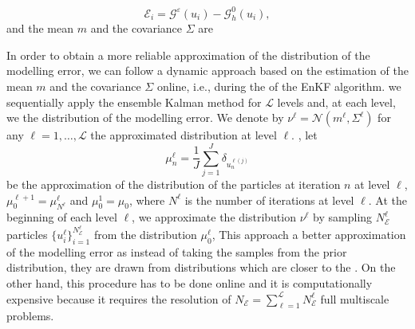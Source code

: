 \documentclass[10pt]{article}
\begin{document}
\[ \mathcal{E}_i = \mathcal{G}^{\varepsilon}(u_i) - \mathcal{G}^0_h(u_i), \]
and the mean $m$ and the covariance $\Sigma$ are 

In order to obtain a more reliable approximation of the distribution of the modelling error, we can follow a dynamic approach based on the estimation of the mean $m$ and the covariance $\Sigma$ online, i.e., during the  of the EnKF algorithm.  we sequentially apply the ensemble Kalman method for $\mathcal{L}$ levels and, at each level, we  the distribution of the modelling error. We denote by $\nu^{\ell} = \mathcal{N}(m^{\ell}, \Sigma^{\ell})$ for any $\ell = 1, \dots, \mathcal{L}$ the approximated distribution at level $\ell$. , let
\[ \mu_n^{\ell} = \frac{1}{J} \sum_{j=1}^J \delta_{u^{\ell (j)}_n} \]
be the approximation of the distribution of the particles at iteration $n$ at level $\ell$, $\mu_0^{\ell + 1} = \mu_{N^{\ell}}^{\ell}$ and $\mu_0^1 = \mu_0$, where $N^{\ell}$ is the number of iterations at level $\ell$. At the beginning of each level $\ell$, we approximate the distribution $\nu^{\ell}$ by sampling $N_{\mathcal{E}}^{\ell}$ particles $\{ u_i^{\ell} \}_{i=1}^{N_{\mathcal{E}}^{\ell}}$ from the distribution $\mu_0^{\ell}$,  This approach  a better approximation of the modelling error as instead of taking the samples from the prior distribution, they are drawn from distributions which are  closer to the . On the other hand, this procedure has to be done online and it is computationally expensive because it requires the resolution of $N_{\mathcal{E}} = \sum_{\ell=1}^{\mathcal{L}} N_{\mathcal{E}}^{\ell}$ full multiscale problems.
\end{document}
